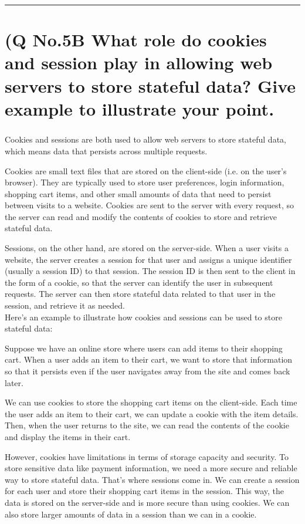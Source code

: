 \documentclass[11pt]{article}
\begin{document}
\noindent\rule{\linewidth}{0.4pt}
\section{(Q No.5B What role do cookies and session play in allowing web servers to store stateful data? Give example to illustrate your point.}
\subparagraph{}
Cookies and sessions are both used to allow web servers to store stateful data, which means data that persists across multiple requests.

Cookies are small text files that are stored on the client-side (i.e. on the user's browser). They are typically used to store user preferences, login information, shopping cart items, and other small amounts of data that need to persist between visits to a website. Cookies are sent to the server with every request, so the server can read and modify the contents of cookies to store and retrieve stateful data.

Sessions, on the other hand, are stored on the server-side. When a user visits a website, the server creates a session for that user and assigns a unique identifier (usually a session ID) to that session. The session ID is then sent to the client in the form of a cookie, so that the server can identify the user in subsequent requests. The server can then store stateful data related to that user in the session, and retrieve it as needed.
\\
Here's an example to illustrate how cookies and sessions can be used to store stateful data:

Suppose we have an online store where users can add items to their shopping cart. When a user adds an item to their cart, we want to store that information so that it persists even if the user navigates away from the site and comes back later.

We can use cookies to store the shopping cart items on the client-side. Each time the user adds an item to their cart, we can update a cookie with the item details. Then, when the user returns to the site, we can read the contents of the cookie and display the items in their cart.

However, cookies have limitations in terms of storage capacity and security. To store sensitive data like payment information, we need a more secure and reliable way to store stateful data. That's where sessions come in. We can create a session for each user and store their shopping cart items in the session. This way, the data is stored on the server-side and is more secure than using cookies. We can also store larger amounts of data in a session than we can in a cookie.
\end{document}
